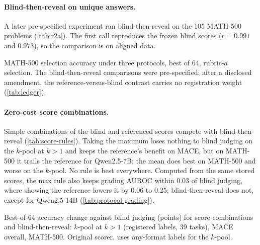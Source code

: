 \paragraph{Blind-then-reveal on unique answers.}
A later pre-specified experiment ran blind-then-reveal on the 105 MATH-500 problems (\cref{tab:r2a}). The first call reproduces the frozen blind scores ($r=0.991$ and $0.973$), so the comparison is on aligned data.

\begin{table}[htbp]
\centering
\caption{MATH-500 selection accuracy under three protocols, best of 64, rubric-$a$ selection. The blind-then-reveal comparisons were pre-specified; after a disclosed amendment, the reference-versus-blind contrast carries no registration weight (\cref{tab:ledger}).}
\label{tab:r2a}
\footnotesize
\begin{adjustbox}{max width=\linewidth}\end{adjustbox}

\end{table}

\paragraph{Zero-cost score combinations.}
Simple combinations of the blind and referenced scores compete with blind-then-reveal (\cref{tab:score-rules}). Taking the maximum loses nothing to blind judging on the $k$-pool at $k{>}1$ and keeps the reference's benefit on \textsc{MACE}, but on MATH-500 it trails the reference for Qwen2.5-7B; the mean does best on MATH-500 and worse on the $k$-pool. No rule is best everywhere. Computed from the same stored scores, the max rule also keeps grading AUROC within 0.03 of blind judging, where showing the reference lowers it by 0.06 to 0.25; blind-then-reveal does not, except for Qwen2.5-14B (\cref{tab:protocol-grading}).\ph

\begin{table}[htbp]
\centering
\footnotesize
\caption{Best-of-64 accuracy change against blind judging (points) for score combinations and blind-then-reveal: $k$-pool at $k{>}1$ (registered labels, 39 tasks), \textsc{MACE} overall, MATH-500. Original scorer.  uses any-format labels for the $k$-pool.\ph}
\label{tab:score-rules}
\begin{adjustbox}{max width=\linewidth}\end{adjustbox}
\end{table}

